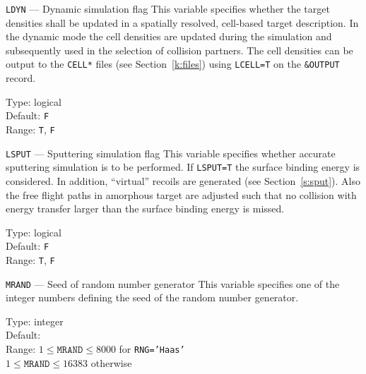 \begin{keydescription}{\texttt{LDYN} --- Dynamic simulation flag}
%
  This variable specifies whether the target densities shall be
  updated in a spatially resolved, cell-based target description.  In
  the dynamic mode the cell densities are updated during the simulation
  and subsequently used in the selection of collision partners.  The cell 
  densities can be output to the \texttt{CELL*} files (see 
  Section~\ref{k:files}) using \texttt{LCELL=T} on the \texttt{\&OUTPUT}
  record.
%
  \begin{keytab}
    Type:    \> logical \\
    Default: \> \texttt{F} \\
    Range:   \> \texttt{T}, \texttt{F}
  \end{keytab}
\end{keydescription}

\begin{keydescription}{\texttt{LSPUT} --- Sputtering simulation flag}
%
  This variable specifies whether accurate sputtering simulation is to be
  performed. If \texttt{LSPUT=T} the surface binding energy is
  considered. In addition, ``virtual'' recoils are generated (see 
  Section~\ref{s:sput}). Also the free flight paths in amorphous target are 
  adjusted such that no collision with energy transfer larger than the surface 
  binding energy is missed.
%
  \begin{keytab}
    Type:    \> logical \\
    Default: \> \texttt{F} \\
    Range:   \> \texttt{T}, \texttt{F}
  \end{keytab}
\end{keydescription}

\begin{keydescription}{\texttt{MRAND} --- Seed of random number generator}
%
  This variable specifies one of the integer numbers defining the seed of
  the random number generator.
%
  \begin{keytab}
    Type:    \> integer \\
    Default:  \\
    Range:   \> $1 \le \texttt{MRAND} \le 8000$ for \texttt{RNG='Haas'} \\
             \> $1 \le \texttt{MRAND} \le 16383$ otherwise
  \end{keytab}
\end{keydescription}

